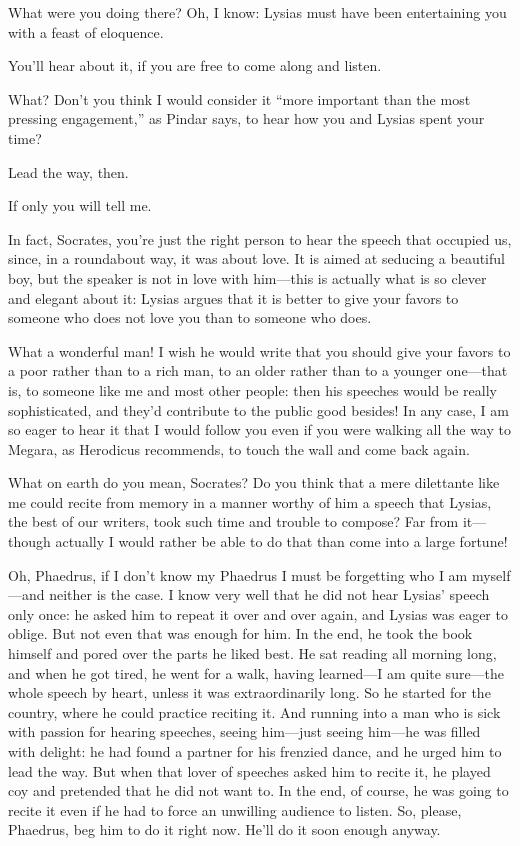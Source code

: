 \saysocrates What were you doing there? Oh, I know: Lysias must have been
entertaining you with a feast of eloquence.

\sayphaedrus You’ll hear about it, if you are free to come along and
listen.

\saysocrates What? Don’t you think I would consider it “more important than
the most pressing engagement,” as Pindar says, to hear how you and
Lysias spent your time?

\sayphaedrus Lead the way, then.

\saysocrates If only you will tell me.

\sayphaedrus In fact, Socrates, you’re just the right person to hear the
speech that occupied us, since, in a roundabout way, it was about love.
It is aimed at seducing a beautiful boy, but the speaker is not in love
with him---this is actually what is so clever and elegant about it:
Lysias argues that it is better to give your favors to someone who does
not love you than to someone who does.

\saysocrates What a wonderful man! I wish he would write that you should 
give your favors to a poor rather than to a rich man, to an
older rather than to a younger one---that is, to someone like me and
most other people: then his speeches would be really sophisticated, and
they’d contribute to the public good besides! In any case, I am so eager
to hear it that I would follow you even if you were walking all the way
to Megara, as Herodicus recommends, to touch the wall and come back
again.

\sayphaedrus What on earth do you mean, Socrates? Do you think that a 
mere dilettante like me could recite from memory in a
manner worthy of him a speech that Lysias, the best of our writers, took
such time and trouble to compose? Far from it---though actually I would
rather be able to do that than come into a large fortune!

\saysocrates Oh, Phaedrus, if I don’t know my Phaedrus I must be forgetting
who I am myself---and neither is the case. I know very well that he did
not hear Lysias’ speech only once: he asked him to repeat it over and
over again, and Lysias was eager to oblige. But not even that was enough
for him. In the end, he took the book himself and pored over the
parts he liked best. He sat reading all morning long, and when he got
tired, he went for a walk, having learned---I am quite sure---the whole
speech by heart, unless it was extraordinarily long. So he started for
the country, where he could practice reciting it. And running into a man
who is sick with passion for hearing speeches, seeing him---just seeing
him---he was filled with delight: he had found a partner for his
frenzied dance, and he urged him to lead the way. But when that
lover of speeches asked him to recite it, he played coy and pretended
that he did not want to. In the end, of course, he was going to recite
it even if he had to force an unwilling audience to listen. So, please,
Phaedrus, beg him to do it right now. He’ll do it soon enough anyway.

